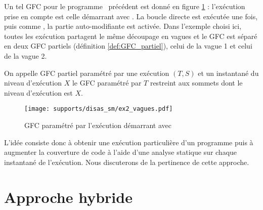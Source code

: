 Un tel GFC pour le programme \sm\ précédent est donné en figure \ref{fig:sm_cfg_vagues} : l'exécution prise en compte est celle démarrant avec . La boucle directe est exécutée une fois, puis comme , la partie auto-modifiante est activée. Dans l'exemple choisi ici, toutes les exécution partagent le même découpage en vagues et le GFC est séparé en deux GFC partiels (définition \ref{def:GFC_partiel}), celui de la vague 1 et celui de la vague 2.

\begin{defi}
 On appelle GFC partiel paramétré par une exécution $(T, S)$ et un instantané du niveau d'exécution $X$ le GFC paramétré par $T$ restreint aux sommets dont le niveau d'exécution est $X$.
\label{def:GFC_partiel}
\end{defi}



\begin{figure}[h]
\begin{center}
  \texttt{[image: supports/disas\_sm/ex2\_vagues.pdf]}
\end{center}
\caption{GFC paramétré par l'exécution démarrant avec }
\label{fig:sm_cfg_vagues}
\end{figure}


L'idée consiste donc à obtenir une exécution particulière d'un programme puis à augmenter la couverture de code à l'aide d'une analyse statique sur chaque instantané de l'exécution. Nous discuterons de la pertinence de cette approche.


\FloatBarrier
\section{Approche hybride}

